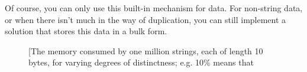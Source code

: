 Of course, you can only use this built-in mechanism for  data. For
non-string data, or when there isn't much in the way of duplication, you can
still implement a solution that stores this data in a bulk form.

\begin{figure}
\centering
	\qquad
	\qquad
	\qquad
	\subfigure[The memory consumed by one million strings, each of length 10
	bytes, for varying degrees of distinctness; e.g. 10\% means that

\end{figure}
